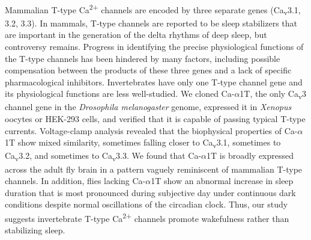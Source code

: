 Mammalian T-type Ca\textsuperscript{2+} channels are encoded by three separate genes (Ca\textsubscript{v}3.1, 3.2, 3.3).
In mammals, T-type channels are reported to be sleep stabilizers that are important in the generation of the delta rhythms of deep sleep, but controversy remains.
Progress in identifying the precise physiological functions of the T-type channels has been hindered by many factors, including possible compensation between the products of these three genes and a lack of specific pharmacological inhibitors.
Invertebrates have only one T-type channel gene and its physiological functions are less well-studied.
We cloned Ca-$\alpha$1T, the only Ca\textsubscript{v}3 channel gene in the \emph{Drosophila melanogaster} genome, expressed it in \emph{Xenopus} oocytes or HEK-293 cells, and verified that it is capable of passing typical T-type currents.
Voltage-clamp analysis revealed that the biophysical properties of Ca-$\alpha$1T show mixed similarity, sometimes falling closer to Ca\textsubscript{v}3.1, sometimes to Ca\textsubscript{v}3.2, and sometimes to Ca\textsubscript{v}3.3.
We found that Ca-$\alpha$1T is broadly expressed across the adult fly brain in a pattern vaguely reminiscent of mammalian T-type channels.
In addition, flies lacking Ca-$\alpha$1T show an abnormal increase in sleep duration that is most pronounced during subjective day under continuous dark conditions despite normal oscillations of the circadian clock.
Thus, our study suggests invertebrate T-type Ca\textsuperscript{2+} channels promote wakefulness rather than stabilizing sleep.
